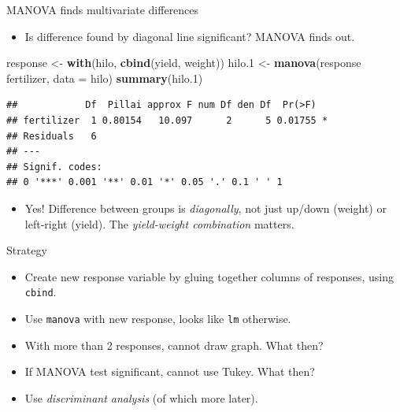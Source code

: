 \documentclass[ignorenonframetext,]{beamer}
\newenvironment{Shaded}{\begin{snugshade}}{\end{snugshade}}
\newcommand{\DataTypeTok}[1]{\textcolor[rgb]{0.13,0.29,0.53}{#1}}
\newcommand{\FloatTok}[1]{\textcolor[rgb]{0.00,0.00,0.81}{#1}}
\newcommand{\KeywordTok}[1]{\textcolor[rgb]{0.13,0.29,0.53}{\textbf{#1}}}
\newcommand{\NormalTok}[1]{#1}
\newcommand{\OperatorTok}[1]{\textcolor[rgb]{0.81,0.36,0.00}{\textbf{#1}}}
\newcommand{\StringTok}[1]{\textcolor[rgb]{0.31,0.60,0.02}{#1}}
\providecommand{\tightlist}{%
  \setlength{\itemsep}{0pt}\setlength{\parskip}{0pt}}
\begin{document}
\begin{frame}[fragile]{MANOVA finds multivariate differences}
\protect\hypertarget{manova-finds-multivariate-differences}{}

\begin{itemize}
\tightlist
\item
  Is difference found by diagonal line significant? MANOVA finds out.
\end{itemize}

\begin{Shaded}
\begin{Highlighting}[]
\NormalTok{response <-}\StringTok{ }\KeywordTok{with}\NormalTok{(hilo, }\KeywordTok{cbind}\NormalTok{(yield, weight))}
\NormalTok{hilo}\FloatTok{.1}\NormalTok{ <-}\StringTok{ }\KeywordTok{manova}\NormalTok{(response }\OperatorTok{~}\StringTok{ }\NormalTok{fertilizer, }\DataTypeTok{data =}\NormalTok{ hilo)}
\KeywordTok{summary}\NormalTok{(hilo}\FloatTok{.1}\NormalTok{)}
\end{Highlighting}
\end{Shaded}

\begin{verbatim}
##            Df  Pillai approx F num Df den Df  Pr(>F)  
## fertilizer  1 0.80154   10.097      2      5 0.01755 *
## Residuals   6                                         
## ---
## Signif. codes:  
## 0 '***' 0.001 '**' 0.01 '*' 0.05 '.' 0.1 ' ' 1
\end{verbatim}

\begin{itemize}
\tightlist
\item
  Yes! Difference between groups is \emph{diagonally}, not just up/down
  (weight) or left-right (yield). The \emph{yield-weight combination}
  matters.
\end{itemize}

\end{frame}

\begin{frame}[fragile]{Strategy}
\protect\hypertarget{strategy}{}

\begin{itemize}
\item
  Create new response variable by gluing together columns of responses,
  using \texttt{cbind}.
\item
  Use \texttt{manova} with new response, looks like \texttt{lm}
  otherwise.
\item
  With more than 2 responses, cannot draw graph. What then?
\item
  If MANOVA test significant, cannot use Tukey. What then?
\item
  Use \emph{discriminant analysis} (of which more later).
\end{itemize}

\end{frame}
\end{document}
